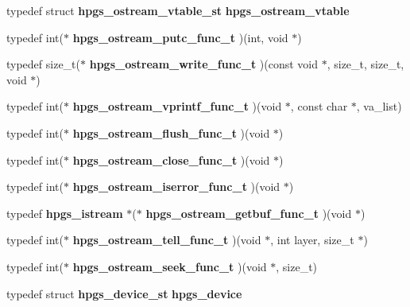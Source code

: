 \begin{DoxyCompactItemize}
\item 
typedef struct {\bf hpgs\_\-ostream\_\-vtable\_\-st} {\bfseries hpgs\_\-ostream\_\-vtable}\label{group__base_ga2b4c0b89aad0445c029e2d3845d5d360}

\item 
typedef int($\ast$ {\bfseries hpgs\_\-ostream\_\-putc\_\-func\_\-t} )(int, void $\ast$)\label{group__base_ga8c774072a71ef4f6dc25f996c4ded5ac}

\item 
typedef size\_\-t($\ast$ {\bfseries hpgs\_\-ostream\_\-write\_\-func\_\-t} )(const void $\ast$, size\_\-t, size\_\-t, void $\ast$)\label{group__base_gafa6e15df29369bef01e53d5e93092489}

\item 
typedef int($\ast$ {\bfseries hpgs\_\-ostream\_\-vprintf\_\-func\_\-t} )(void $\ast$, const char $\ast$, va\_\-list)\label{group__base_ga2d992564508c4d5906649fb7d050b8fe}

\item 
typedef int($\ast$ {\bfseries hpgs\_\-ostream\_\-flush\_\-func\_\-t} )(void $\ast$)\label{group__base_ga150a622af849722d9fda7eec6fae0d48}

\item 
typedef int($\ast$ {\bfseries hpgs\_\-ostream\_\-close\_\-func\_\-t} )(void $\ast$)\label{group__base_gaa65e4bab9e215962cd7be730737d804f}

\item 
typedef int($\ast$ {\bfseries hpgs\_\-ostream\_\-iserror\_\-func\_\-t} )(void $\ast$)\label{group__base_ga41a536b40e02ad3f2699b66d653c875a}

\item 
typedef {\bf hpgs\_\-istream} $\ast$($\ast$ {\bfseries hpgs\_\-ostream\_\-getbuf\_\-func\_\-t} )(void $\ast$)\label{group__base_ga16f71e23dc6b7b0a2f3edfd69400fd32}

\item 
typedef int($\ast$ {\bfseries hpgs\_\-ostream\_\-tell\_\-func\_\-t} )(void $\ast$, int layer, size\_\-t $\ast$)\label{group__base_ga58fbc47400676e8566943232871e1d00}

\item 
typedef int($\ast$ {\bfseries hpgs\_\-ostream\_\-seek\_\-func\_\-t} )(void $\ast$, size\_\-t)\label{group__base_gad2ade65e145c72c1093f3ccb009d80c6}

\item 
typedef struct {\bf hpgs\_\-device\_\-st} {\bfseries hpgs\_\-device}\label{group__device_ga100927b1ad4b437d61dddc42708fa8f3}


\end{DoxyCompactItemize}
